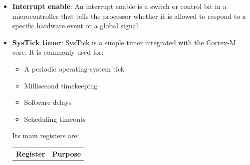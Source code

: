\documentclass{report}
\begin{document}
\begin{itemize}
            \begin{enumerate}
                \item TIM2 sets its own update flag.
                \item If the timer’s update interrupt is enabled, it signals the NVIC.
                \item The NVIC marks TIM2’s interrupt pending.
                \item The CPU compares its priority with the current execution priority.
                \item The CPU enters TIM2_IRQHandler.
                \item Software clears the TIM2 update flag.
                \item The processor returns from the exception.
            \end{enumerate}
            There are therefore usually two enable controls:
            \bigbreak \noindent 
            \begin{center}
                Peripheral interrupt enable + NVIC interrupt enable
            \end{center}
            Both must be configured.
            \bigbreak \noindent 
            Similarly, clearing the NVIC pending bit alone may not solve the problem. If the peripheral’s source flag remains set, it can request the interrupt again
        \item \textbf{Interrupt enable}: An interrupt enable is a switch or control bit in a microcontroller that tells the processor whether it is allowed to respond to a specific hardware event or a global signal
        \item \textbf{SysTick timer}: 
            SysTick is a simple timer integrated with the Cortex‑M core. It is commonly used for:
            \begin{itemize}
                \item A periodic operating-system tick
                \item Millisecond timekeeping
                \item Software delays
                \item Scheduling timeouts
            \end{itemize}
            Its main registers are:
            \begin{center}
                \begin{tabularx}{\textwidth}{@{}XX@{}}
                    \toprule
                    \textbf{Register}&	\textbf{Purpose} \\

\end{tabularx}
\end{center}
\end{itemize}
\end{document}
